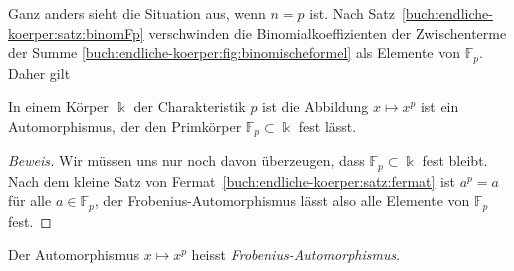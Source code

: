Ganz anders sieht die Situation aus, wenn $n=p$ ist.
Nach Satz~\ref{buch:endliche-koerper:satz:binomFp} verschwinden die
Binomialkoeffizienten der Zwischenterme der Summe
\eqref{buch:endliche-koerper:fig:binomischeformel}
als Elemente von $\mathbb{F}_p$.
Daher gilt

\begin{satz}
In einem Körper $\Bbbk$ der Charakteristik $p$ ist die Abbildung
$x\mapsto x^p$ ist ein Automorphismus, der den Primkörper 
$\mathbb{F}_p\subset\Bbbk$ fest lässt.
\end{satz}

\begin{proof}[Beweis]
Wir müssen uns nur noch davon überzeugen, dass $\mathbb{F}_p\subset\Bbbk$
fest bleibt.
Nach dem kleine Satz von Fermat~\ref{buch:endliche-koerper:satz:fermat}
ist $a^p=a$ für alle $a\in\mathbb{F}_p$, der Frobenius-Automorphismus
lässt also alle Elemente von $\mathbb{F}_p$ fest.
\end{proof}

\begin{definition}
Der Automorphismus $x\mapsto x^p$ heisst {\em Frobenius-Automorphismus}.
\end{definition}
